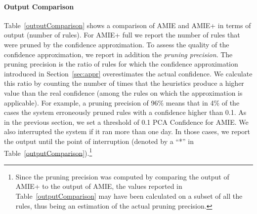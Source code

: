 \paragraph{Output Comparison}
Table~\ref{outputComparison} shows a comparison of AMIE and AMIE+ in terms of output (number of rules).
For AMIE+ full we report the number of rules that were pruned by the confidence approximation.
To assess the quality of the confidence approximation, we report in addition the \emph{pruning precision}.
The pruning precision is the ratio of rules for which the confidence approximation introduced
in Section~\ref{sec:appr} overestimates the actual confidence. We
calculate this ratio by counting the number of times that the heuristics
produce a higher value than the real confidence (among the rules on which the approximation is applicable).
For example, a pruning precision of 96\% means
that in 4\% of the cases the system erroneously pruned rules with a confidence higher than 0.1.
As in the previous section, we set a threshold of 0.1 PCA Confidence for AMIE. We also interrupted the system 
if it ran more than one day. In those cases, we report the output until the point of interruption (denoted by a ``*'' in Table~\ref{outputComparison}).\footnote{Since the pruning precision was computed by comparing the output of AMIE+ to the output of AMIE, the values reported in Table~\ref{outputComparison} may have been calculated on a subset of all the rules, thus being an estimation of the actual pruning precision.} 

